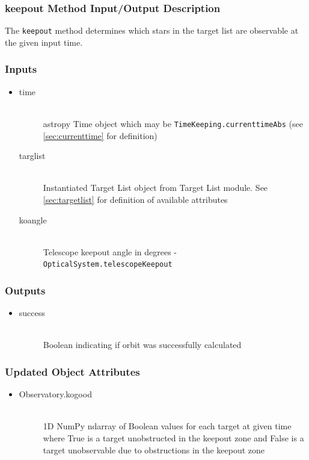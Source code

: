 \documentclass[cleanfoot]{asme2ej}
\begin{document}
\subsubsection{keepout Method Input/Output Description} \label{sec:keepouttask} 
The \verb+keepout+ method determines which stars in the target list are observable at the given input time.

\subsubsection*{Inputs}
\begin{itemize}
    \item
    \begin{description}
        \item[time] \hfill \\
        astropy Time object which may be \verb+TimeKeeping.currenttimeAbs+ (see \ref{sec:currenttime} for definition)
        \item[targlist] \hfill \\
        Instantiated Target List object from Target List module. See \ref{sec:targetlist} for definition of available attributes
        \item[koangle] \hfill \\
        Telescope keepout angle in degrees - \verb+OpticalSystem.telescopeKeepout+
    \end{description}
\end{itemize}

\subsubsection*{Outputs}
\begin{itemize}
    \item
    \begin{description}
        \item[success] \hfill \\
        Boolean indicating if orbit was successfully calculated
    \end{description}
\end{itemize}

\subsubsection*{Updated Object Attributes}
\begin{itemize}
    \item 
    \begin{description}
        \item[Observatory.kogood] \hfill \\
        1D NumPy ndarray of Boolean values for each target at given time where True is a target unobstructed in the keepout zone and False is a target unobservable due to obstructions in the keepout zone
    \end{description}
\end{itemize}
\end{document}
